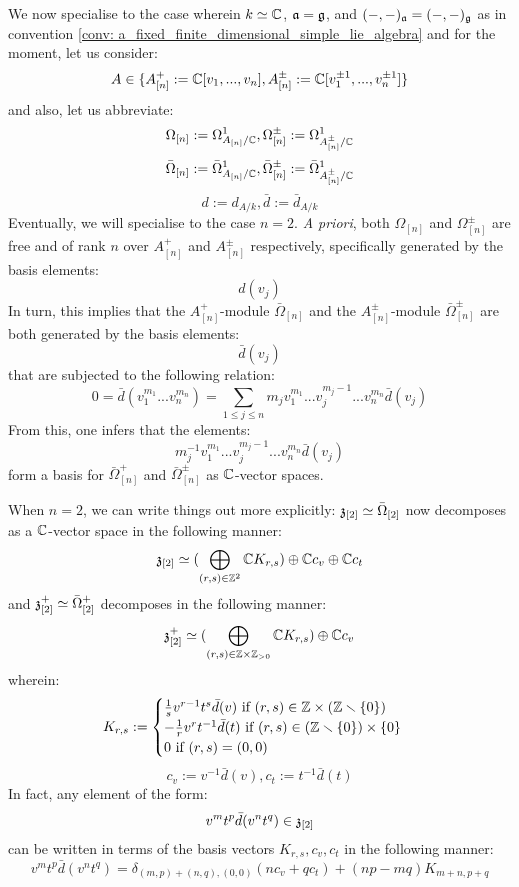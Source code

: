 \begin{remark}
            We now specialise to the case wherein $k \simeq \mathbb{C}$, $\mathfrak{a} = \mathfrak{g}$, and $(-, -)_{\mathfrak{a}} = (-, -)_{\mathfrak{g}}$ as in convention \ref{conv: a_fixed_finite_dimensional_simple_lie_algebra} and for the moment, let us consider:
                $$A \in \{ A_{[n]}^+ := \mathbb{C}[v_1, ..., v_n], A_{[n]}^{\pm} := \mathbb{C}[v_1^{\pm 1}, ..., v_n^{\pm 1}] \}$$
            and also, let us abbreviate:
                $$\Omega_{[n]} := \Omega^1_{A_{[n]}/\mathbb{C}}, \Omega^{\pm}_{[n]} := \Omega^1_{A_{[n]}^{\pm}/\mathbb{C}}$$
                $$\bar{\Omega}_{[n]} := \bar{\Omega}^1_{A_{[n]}/\mathbb{C}}, \bar{\Omega}_{[n]}^{\pm} := \bar{\Omega}^1_{A_{[n]}^{\pm}/\mathbb{C}}$$
                $$d := d_{A/k}, \bar{d} := \bar{d}_{A/k}$$
            Eventually, we will specialise to the case $n = 2$. \textit{A priori}, both $\Omega_{[n]}$ and $\Omega^{\pm}_{[n]}$ are free and of rank $n$ over $A_{[n]}^+$ and $A_{[n]}^{\pm}$ respectively, specifically generated by the basis elements:
                $$d(v_j)$$
            In turn, this implies that the $A_{[n]}^+$-module $\bar{\Omega}_{[n]}$ and the $A_{[n]}^{\pm}$-module $\bar{\Omega}_{[n]}^{\pm}$ are both generated by the basis elements:
                $$\bar{d}(v_j)$$
            that are subjected to the following relation:
                $$0 = \bar{d}( v_1^{m_1} ... v_n^{m_n} ) = \sum_{1 \leq j \leq n} m_j v_1^{m_1} ... v_j^{m_j - 1} ... v_n^{m_n} \bar{d}(v_j)$$
            From this, one infers that the elements:
                $$m_j^{-1} v_1^{m_1} ... v_j^{m_j - 1} ... v_n^{m_n} \bar{d}(v_j)$$
            form a basis for $\bar{\Omega}^+_{[n]}$ and $\bar{\Omega}_{[n]}^{\pm}$ as $\mathbb{C}$-vector spaces. 

            When $n = 2$, we can write things out more explicitly: $\mathfrak{z}_{[2]} \simeq \bar{\Omega}_{[2]}$ now decomposes as a $\mathbb{C}$-vector space in the following manner:
                $$\mathfrak{z}_{[2]} \simeq ( \bigoplus_{(r, s) \in \mathbb{Z}^2} \mathbb{C} K_{r, s}) \oplus \mathbb{C} c_v \oplus \mathbb{C} c_t$$
            and $\mathfrak{z}_{[2]}^+ \simeq \bar{\Omega}_{[2]}^+$ decomposes in the following manner:
                $$\z_{[2]}^+ \cong ( \bigoplus_{(r, s) \in \Z \x \Z_{> 0}} \bbC K_{r, s}) \oplus \bbC c_v$$
            wherein:
                $$
                    K_{r, s} :=
                    \begin{cases}
                        \text{$\frac1s v^{r - 1} t^s \bar{d}(v)$ if $(r, s) \in \Z \x (\Z \setminus \{0\})$}
                        \\
                        \text{$-\frac1r v^r t^{-1} \bar{d}(t)$ if $(r, s) \in (\Z \setminus \{0\}) \x \{0\}$}
                        \\
                        \text{$0$ if $(r, s) = (0, 0)$}
                    \end{cases}
                $$
                $$c_v := v^{-1} \bar{d}(v), c_t := t^{-1} \bar{d}(t)$$
            In fact, any element of the form:
                $$v^m t^p \bar{d}(v^n t^q) \in \mathfrak{z}_{[2]}$$
            can be written in terms of the basis vectors $K_{r, s}, c_v, c_t$ in the following manner:
                $$v^m t^p \bar{d}(v^n t^q) = \delta_{(m, p) + (n, q), (0, 0)} ( n c_v + q c_t ) + (np - mq) K_{m + n, p + q}$$


\end{remark}
